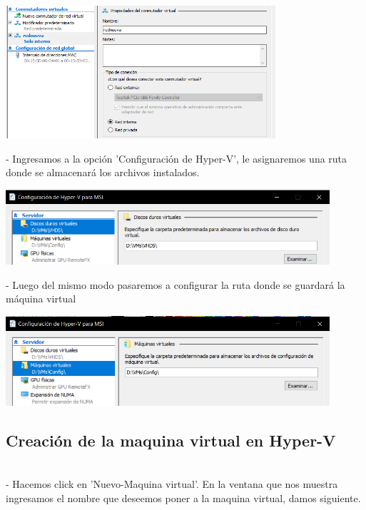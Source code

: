 \documentclass[12pt,letterpaper]{article}
\begin{document}
\begin{center}
	\includegraphics[width=10cm]{./Imagenes/4} 
\end{center}


\begin{itemize}
- Ingresamos a la opción 'Configuración de Hyper-V', le asignaremos una ruta donde se almacenará los archivos instalados.\\
\end{itemize}

\begin{center}
	\includegraphics[width=12cm]{./Imagenes/5} 
\end{center}



\begin{itemize}
- Luego del mismo modo pasaremos a configurar la ruta donde se guardará la máquina virtual\\
\end{itemize}

\begin{center}
	\includegraphics[width=12cm]{./Imagenes/6} 
\end{center}

\begin{itemize}

\subsection{Creación de la maquina virtual en Hyper-V}\\
- Hacemos click en 'Nuevo-Maquina virtual'. En la ventana que nos muestra ingresamos el nombre que deseemos poner a la maquina virtual, damos siguiente.
\end{itemize}
\end{document}
